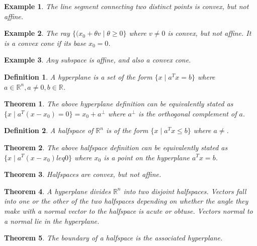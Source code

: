 \documentclass[a4paper]{article}
\newtheorem{mytheorem}{Theorem}
\newtheorem{example}{Example}
\newtheorem{mydef}{Definition}
\numberwithin{mytheorem}{section}
\numberwithin{mydef}{section}
\numberwithin{example}{section}
\begin{document}
\begin{example} The line segment connecting two distinct points is convex, but not affine.
\end{example}

\begin{example} The ray $\{ (x_{0} + \theta v \mid \theta \geq 0\}$ where $v \neq 0$ is convex, but not affine. It is a convex cone if its base $x_{0} = 0$. 
\end{example}

\begin{example} Any subspace is affine, and also a convex cone.
\end{example}

\begin{mydef} A hyperplane is a set of the form $\{ x \mid a^{T}x = b \}$ where $a \in \mathbb{R}^{n}, a \neq 0, b \in \mathbb{R}$. \end{mydef}

\begin{mytheorem} The above hyperplane definition can be equivalently stated as $\{ x \mid a^{T}(x-x_{0}) = 0 \} = x_{0} + a^{\bot}$ where $a^{\bot}$ is the orthogonal complement of $a$. \end{mytheorem}

\begin{mydef} A halfspace of $\mathbb{R}^{n}$ is of the form $\{ x \mid a^{T}x \leq b \}$ where $a \neq $. \end{mydef}

\begin{mytheorem} The above halfspace definition can be equivalently stated as $\{ x \mid a^{T}(x-x_{0}) leq 0 \}$ where $x_{0}$ is a point on the hyperplane $a^{T}x = b$. \end{mytheorem}

\begin{mytheorem} Halfspaces are convex, but not affine. \end{mytheorem}

\begin{mytheorem} A hyperplane divides $\mathbb{R}^{n}$ into two disjoint halfspaces. Vectors fall into one or the other of the two halfspaces depending on whether the angle they make with a normal vector to the halfspace is acute or obtuse. Vectors normal to a normal lie in the hyperplane. \end{mytheorem}

\begin{mytheorem} The boundary of a halfspace is the associated hyperplane. \end{mytheorem}
\end{document}
